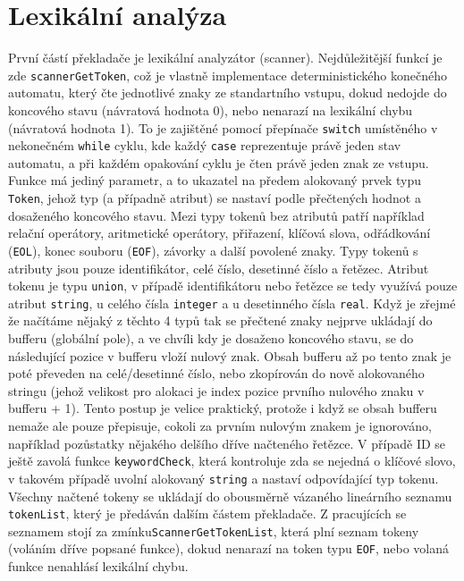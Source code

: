 \documentclass[a4paper, 12pt]{article}
\begin{document}
\section{Lexikální analýza}
První částí překladače je lexikální analyzátor (scanner). Nejdůležitější funkcí je zde \linebreak \verb|scannerGetToken|, což je vlastně implementace deterministického konečného automatu, který čte jednotlivé znaky ze standartního vstupu, dokud nedojde do koncového stavu (návratová hodnota 0), nebo nenarazí na lexikální chybu (návratová hodnota 1). To je zajištěné pomocí přepínače \verb|switch| umístěného v nekonečném \verb|while| cyklu, kde každý \verb|case| reprezentuje právě jeden stav automatu, a při každém opakování cyklu je čten právě jeden znak ze vstupu.
\newline
\newline
Funkce má jediný parametr, a to ukazatel na předem alokovaný prvek typu \verb|Token|, jehož typ (a případně atribut) se nastaví podle přečtených hodnot a dosaženého koncového stavu. Mezi typy tokenů bez atributů patří například relační operátory, aritmetické operátory, přiřazení, klíčová slova, odřádkování (\verb|EOL|), konec souboru (\verb|EOF|), závorky a další povolené znaky.
\newline
\newline
Typy tokenů s atributy jsou pouze identifikátor, celé číslo, desetinné číslo a řetězec. Atribut tokenu je typu \verb|union|, v případě identifikátoru nebo řetězce se tedy využívá pouze atribut \verb|string|, u celého čísla \verb|integer| a u desetinného čísla \verb|real|. Když je zřejmé že načítáme nějaký z těchto 4 typů tak se přečtené znaky nejprve ukládají do bufferu (globální pole), a ve chvíli kdy je dosaženo koncového stavu, se do následující pozice v bufferu vloží nulový znak. Obsah bufferu až po tento znak je poté převeden na celé/desetinné číslo, nebo zkopírován do nově alokovaného stringu (jehož velikost pro alokaci je index pozice prvního nulového znaku v bufferu + 1). Tento postup je velice praktický, protože i když se obsah bufferu nemaže ale pouze přepisuje, cokoli za prvním nulovým znakem je ignorováno, například pozůstatky nějakého delšího dříve načteného řetězce. V případě ID se ještě zavolá funkce \verb|keywordCheck|, která kontroluje zda se nejedná o klíčové slovo, v takovém případě uvolní alokovaný \verb|string| a nastaví odpovídající typ tokenu.
\newline
\newline
Všechny načtené tokeny se ukládají do obousměrně vázaného lineárního seznamu \verb|tokenList|, který je předáván dalším částem překladače. Z pracujících se seznamem stojí za zmínku\linebreak \verb|ScannerGetTokenList|, která plní seznam tokeny (voláním dříve popsané funkce), dokud nenarazí na token typu \verb|EOF|, nebo volaná funkce nenahlásí lexikální chybu. 
\end{document}
